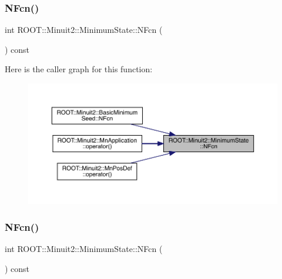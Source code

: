 \subsubsection{\texorpdfstring{NFcn()}{NFcn()}\hspace{0.1cm}{\footnotesize\ttfamily [1/3]}}
{\footnotesize\ttfamily int R\+O\+O\+T\+::\+Minuit2\+::\+Minimum\+State\+::\+N\+Fcn (\begin{DoxyParamCaption}{ }\end{DoxyParamCaption}) const\hspace{0.3cm}{\ttfamily [inline]}}

Here is the caller graph for this function\+:
\nopagebreak
\begin{figure}[H]
\begin{center}
\leavevmode
\includegraphics[width=350pt]{db/dcd/classROOT_1_1Minuit2_1_1MinimumState_aedc2a07bcaf49ef63ac092a867463731_icgraph}
\end{center}
\end{figure}
\mbox{\label{classROOT_1_1Minuit2_1_1MinimumState_aedc2a07bcaf49ef63ac092a867463731}} 
\subsubsection{\texorpdfstring{NFcn()}{NFcn()}\hspace{0.1cm}{\footnotesize\ttfamily [2/3]}}
{\footnotesize\ttfamily int R\+O\+O\+T\+::\+Minuit2\+::\+Minimum\+State\+::\+N\+Fcn (\begin{DoxyParamCaption}{ }\end{DoxyParamCaption}) const\hspace{0.3cm}{\ttfamily [inline]}}

\mbox{\label{classROOT_1_1Minuit2_1_1MinimumState_aedc2a07bcaf49ef63ac092a867463731}} 
